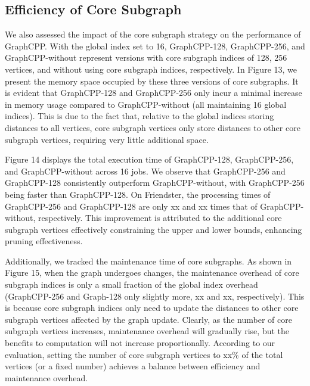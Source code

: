 \documentclass[lettersize,journal]{IEEEtran} %
\begin{document}
\subsection{Efficiency of Core Subgraph}
We also assessed the impact of the core subgraph strategy on the performance of GraphCPP. With the global index set to 16, GraphCPP-128, GraphCPP-256, and GraphCPP-without represent versions with core subgraph indices of 128, 256 vertices, and without using core subgraph indices, respectively. In Figure 13, we present the memory space occupied by these three versions of core subgraphs. It is evident that GraphCPP-128 and GraphCPP-256 only incur a minimal increase in memory usage compared to GraphCPP-without (all maintaining 16 global indices). This is due to the fact that, relative to the global indices storing distances to all vertices, core subgraph vertices only store distances to other core subgraph vertices, requiring very little additional space.

Figure 14 displays the total execution time of GraphCPP-128, GraphCPP-256, and GraphCPP-without across 16 jobs. We observe that GraphCPP-256 and GraphCPP-128 consistently outperform GraphCPP-without, with GraphCPP-256 being faster than GraphCPP-128. On Friendster, the processing times of GraphCPP-256 and GraphCPP-128 are only xx and xx times that of GraphCPP-without, respectively. This improvement is attributed to the additional core subgraph vertices effectively constraining the upper and lower bounds, enhancing pruning effectiveness.

Additionally, we tracked the maintenance time of core subgraphs. As shown in Figure 15, when the graph undergoes changes, the maintenance overhead of core subgraph indices is only a small fraction of the global index overhead (GraphCPP-256 and Graph-128 only slightly more, xx and xx, respectively). This is because core subgraph indices only need to update the distances to other core subgraph vertices affected by the graph update. Clearly, as the number of core subgraph vertices increases, maintenance overhead will gradually rise, but the benefits to computation will not increase proportionally. According to our evaluation, setting the number of core subgraph vertices to xx\% of the total vertices (or a fixed number) achieves a balance between efficiency and maintenance overhead.
\end{document}
